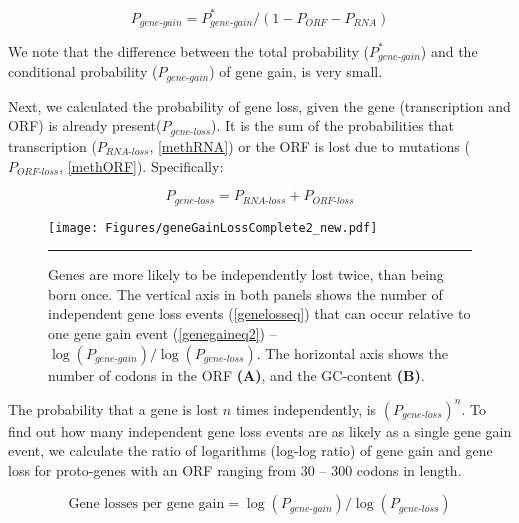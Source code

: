 \documentclass[12pt,a4paper]{article}
\begin{document}
\begin{equation}
P_\textit{gene-gain} = P_\textit{gene-gain}^*/(1-P_\textit{ORF} - P_\textit{RNA})
\label{genegaineq2}
\end{equation}

We note that the difference between the total probability ($P_\textit{gene-gain}^*$) and the conditional probability ($P_\textit{gene-gain}$) of gene gain, is very small.

Next, we calculated the probability of gene loss, given the gene (transcription and ORF) is already present($P_\textit{gene-loss}$). It is the sum of the probabilities that transcription ($P_\textit{RNA-loss}$, \autoref{methRNA}) or the ORF is lost due to mutations ($P_\textit{ORF-loss}$, \autoref{methORF}). Specifically:

\begin{equation}
P_\textit{gene-loss} = P_\textit{RNA-loss} + P_\textit{ORF-loss}
\label{genelosseq}
\end{equation}

\begin{figure}[!t]
\centering
\texttt{[image: Figures/geneGainLossComplete2\_new.pdf]}
\caption{Genes are more likely to be independently lost twice, than being born once. The vertical axis in both panels shows the number of independent gene loss events (\autoref{genelosseq}) that can occur relative to one gene gain event (\autoref{genegaineq2}) -- $\log(P_\textit{gene-gain})/\log(P_\textit{gene-loss})$. The horizontal axis shows the number of codons in the ORF \textbf{(A)}, and the GC-content \textbf{(B)}.}
\label{gainlossprob}
\vspace{1ex}
\hrule
\end{figure}

The probability that a gene is lost $n$ times independently, is $(P_\textit{gene-loss})^{n}$. To find out how many independent gene loss events are as likely as a single gene gain event, we calculate the ratio of logarithms (log-log ratio) of gene gain and gene loss for proto-genes with an ORF ranging from 30 -- 300 codons in length.

$$ \text{Gene losses per gene gain} = \log(P_\textit{gene-gain})/\log(P_\textit{gene-loss})$$
\end{document}
